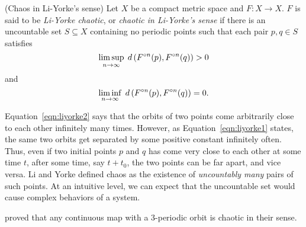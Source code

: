 \documentclass[12pt,draft,twoside]{book}
\begin{document}
\begin{definition}
  (Chaos in Li-Yorke's sense)
  Let $X$ be a compact metric space and $F: X\to X$.
  $F$ is said to be \textit{Li-Yorke chaotic}, or 
  \textit{chaotic in Li-Yorke's sense} if there is an uncountable set $S \subseteq X$ containing no
  periodic points such that each pair $p,q \in S$ satisfies
  \begin{equation}
    \limsup\limits_{n \to \infty}\; d\left( F^{\circ n}(p) , F^{\circ n}(q) \right) > 0
    \label{eqn:liyorke1}
  \end{equation}
  and
  \begin{equation}
    \liminf\limits_{n \to \infty}\; d\left( F^{\circ n}(p) , F^{\circ n}(q) \right) = 0.
    \label{eqn:liyorke2}
  \end{equation}
\end{definition}
Equation~\eqref{eqn:liyorke2} says that the orbits of two points come arbitrarily close to each other infinitely many times.
However, as Equation~\eqref{eqn:liyorke1} states, the same two orbits get separated by some positive constant infinitely often.
Thus, even if two initial points $p$ and $q$ has come very close to each other at some time $t$, after some time, say $t + t_0$, the two points can be far apart, and vice versa.
Li and Yorke defined chaos as the existence of \textit{uncountably many} pairs of such points.
At an intuitive level, we can expect that the uncountable set would cause complex behaviors of a system.

\citet{li-yorke} proved that any continuous map with a 3-periodic orbit is chaotic in their sense.
\end{document}
